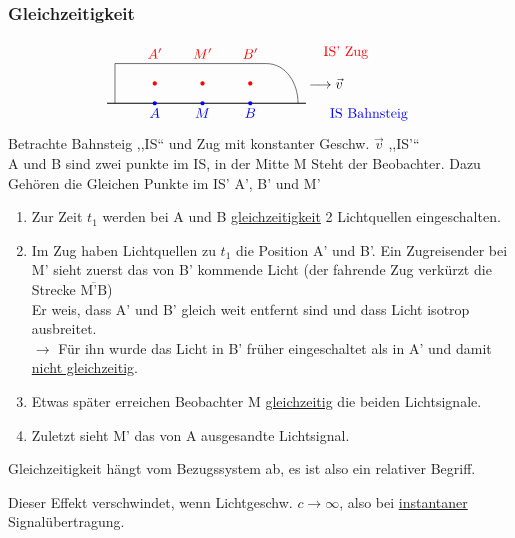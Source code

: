 \documentclass[titlepage,12pt,a4paper,ngerman]{report}
\newcommand{\tx}[1]{\textrm{#1}}
\newcommand{\rbox}[1]{\begin{tcolorbox}[colback=white,colframe=red!75!black]#1\end{tcolorbox}} %
\begin{document}
{\subsubsection{Gleichzeitigkeit}
$$
\begin{tikzpicture}
\draw[thick] (0,0) -- (5,0);
\draw (0.2,0) -- (0.2,1);
\draw (0.2,1) -- (4,1);
\draw[-] (4,1) to [out=0,in=90] (4.8,0);
\draw[red,text=red] (1.2,1) node[above]{$A'$};
\fill[red] (1.2,0.5)  circle[radius=1.5pt];
\draw[red,text=red] (2.4,1) node[above]{$M'$};
\fill[red] (2.4,0.5)  circle[radius=1.5pt];
\draw[red,text=red] (3.6,1) node[above]{$B'$};
\fill[red] (3.6,0.5)  circle[radius=1.5pt];
\draw[red,text=red] (6,1) node[above]{IS' Zug};
\draw[blue,text=blue] (1.2,0) node[below]{$A$};
\fill[blue] (1.2,0)  circle[radius=1.5pt];
\draw[blue,text=blue] (2.4,0) node[below]{$M$};
\fill[blue] (2.4,0)  circle[radius=1.5pt];
\draw[blue,text=blue] (3.6,0) node[below]{$B$};
\fill[blue] (3.6,0)  circle[radius=1.5pt];
\draw[blue,text=blue] (6.58,0) node[below]{IS Bahnsteig};
\node at (5.5,0.5) [align=flush center,text width=3cm]
{$\longrightarrow \vec{v}$};
\end{tikzpicture}$$
Betrachte Bahnsteig ,,IS`` und Zug mit konstanter Geschw. $ \vec{v} $ ,,IS'``\\
A und B sind zwei punkte im IS, in der Mitte M Steht der Beobachter. Dazu Gehören die Gleichen Punkte im IS' A', B' und M'
\begin{enumerate}[1.)]
	\item Zur Zeit $ t_1 $ werden bei A und B \underline{gleichzeitigkeit} 2 Lichtquellen eingeschalten.
	\item Im Zug haben Lichtquellen zu $ t_1 $ die Position A' und B'. Ein Zugreisender bei M' sieht zuerst das von B' kommende Licht (der fahrende Zug verkürzt die Strecke $ \overline{\tx{M'B}} $) \\
	Er weis, dass A' und B' gleich weit entfernt sind und dass Licht isotrop ausbreitet.\\
	$ \rightarrow $ Für ihn wurde das Licht in B' früher eingeschaltet als in A' und damit \underline{nicht gleichzeitig}.
	\item Etwas später erreichen Beobachter M \underline{gleichzeitig} die beiden Lichtsignale.
	\item Zuletzt sieht M' das von A ausgesandte Lichtsignal.
\end{enumerate}
\rbox{Gleichzeitigkeit hängt vom Bezugssystem ab, es ist also ein relativer Begriff.}
Dieser Effekt verschwindet, wenn Lichtgeschw. $ c \rightarrow \infty $, also bei \underline{instantaner} Signalübertragung.

}
\end{document}
